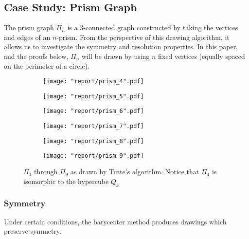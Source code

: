 \documentclass[11pt]{report}
\begin{document}
\subsection{Case Study: Prism Graph}
The prism graph $\Pi_{n}$ is a 3-connected graph constructed by taking the vertices and edges of an $n$-prism. From the perspective of this drawing algorithm, it allows us to investigate the symmetry and resolution properties. In this paper, and the proofs below, $\Pi_{n}$ will be drawn by using $n$ fixed vertices (equally spaced on the perimeter of a circle).

\begin{figure}[H]
    \begin{subfigure}{.3\textwidth}
        \texttt{[image: "report/prism\_4".pdf]}
    \end{subfigure}
    \begin{subfigure}{.3\textwidth}
        \texttt{[image: "report/prism\_5".pdf]}
    \end{subfigure}
    \begin{subfigure}{.3\textwidth}
        \texttt{[image: "report/prism\_6".pdf]}
    \end{subfigure}
    \begin{subfigure}{.3\textwidth}
        \texttt{[image: "report/prism\_7".pdf]}
    \end{subfigure}
    \begin{subfigure}{.3\textwidth}
        \texttt{[image: "report/prism\_8".pdf]}
    \end{subfigure}
    \begin{subfigure}{.3\textwidth}
        \texttt{[image: "report/prism\_9".pdf]}
    \end{subfigure}
    \caption{$\Pi_4$ through $\Pi_{9}$ as drawn by Tutte's algorithm. Notice that $\Pi_4$ is isomorphic to the hypercube $Q_3$}
\end{figure}

\subsubsection{Symmetry}
Under certain conditions, the barycenter method produces drawings which preserve symmetry.
\end{document}
